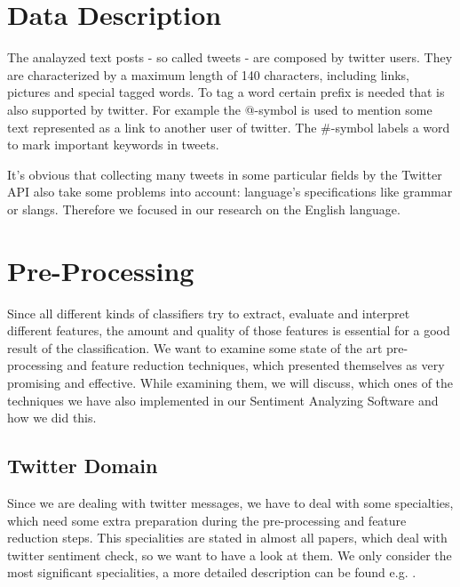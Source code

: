 \documentclass{sig-alternate}
\begin{document}
\section{Data Description}
The analayzed text posts - so called tweets - are composed by twitter users. They are characterized by a maximum length of 140 characters, including links, pictures and special tagged words. To tag a word certain prefix is needed that is also supported by twitter. For example the @-symbol is used to mention some text represented as a link to another user of twitter. The \#-symbol labels a word to mark important keywords in tweets.

It's obvious that collecting many tweets in some particular fields by the Twitter API also take some problems into account: language's specifications like grammar or slangs. Therefore we focused in our research on the English language.

\section{Pre-Processing}
Since all different kinds of classifiers try to extract, evaluate and interpret different features, the amount and quality of those features is essential for a good result of the classification. We want to examine some state of the art pre-processing and feature reduction techniques, which presented themselves as very promising and effective. While examining them, we will discuss, which ones of the techniques we have also implemented in our Sentiment Analyzing Software and how we did this.

\subsection{Twitter Domain}
Since we are dealing with twitter messages, we have to deal with some specialties, which need some extra preparation during the pre-processing and feature reduction steps. This specialities are stated in almost all papers, which deal with twitter sentiment check, so we want to have a look at them. We only consider the most significant specialities, a more detailed description can be found e.g. \cite{Anthony2010Twitter}.
\end{document}
